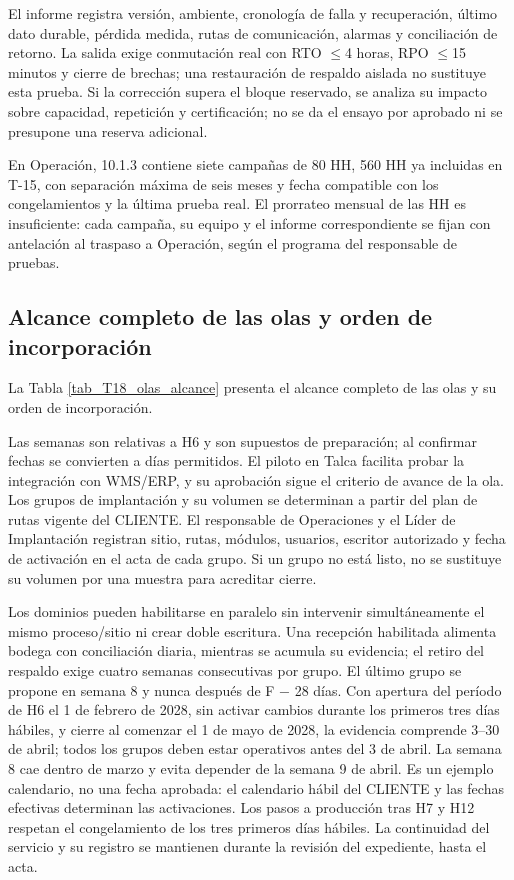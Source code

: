 El informe registra versión, ambiente, cronología de falla y recuperación, último dato durable, pérdida medida, rutas de comunicación, alarmas y conciliación de retorno. La salida exige conmutación real con RTO \ensuremath{\leq}4 horas, RPO \ensuremath{\leq}15 minutos y cierre de brechas; una restauración de respaldo aislada no sustituye esta prueba. Si la corrección supera el bloque reservado, se analiza su impacto sobre capacidad, repetición y certificación; no se da el ensayo por aprobado ni se presupone una reserva adicional.

En Operación, 10.1.3 contiene siete campañas de 80 HH, 560 HH ya incluidas en T-15, con separación máxima de seis meses y fecha compatible con los congelamientos y la última prueba real. El prorrateo mensual de las HH es insuficiente: cada campaña, su equipo y el informe correspondiente se fijan con antelación al traspaso a Operación, según el programa del responsable de pruebas.

\subsection{Alcance completo de las olas y orden de incorporación}

La Tabla \ref{tab_T18_olas_alcance} presenta el alcance completo de las olas y su orden de incorporación.


Las semanas son relativas a H6 y son supuestos de preparación; al confirmar fechas se convierten a días permitidos. El piloto en Talca facilita probar la integración con WMS/ERP, y su aprobación sigue el criterio de avance de la ola. Los grupos de implantación y su volumen se determinan a partir del plan de rutas vigente del CLIENTE. El responsable de Operaciones y el Líder de Implantación registran sitio, rutas, módulos, usuarios, escritor autorizado y fecha de activación en el acta de cada grupo. Si un grupo no está listo, no se sustituye su volumen por una muestra para acreditar cierre.

Los dominios pueden habilitarse en paralelo sin intervenir simultáneamente el mismo proceso/sitio ni crear doble escritura. Una recepción habilitada alimenta bodega con conciliación diaria, mientras se acumula su evidencia; el retiro del respaldo exige cuatro semanas consecutivas por grupo. El último grupo se propone en semana 8 y nunca después de F − 28 días. Con apertura del período de H6 el 1 de febrero de 2028, sin activar cambios durante los primeros tres días hábiles, y cierre al comenzar el 1 de mayo de 2028, la evidencia comprende 3–30 de abril; todos los grupos deben estar operativos antes del 3 de abril. La semana 8 cae dentro de marzo y evita depender de la semana 9 de abril. Es un ejemplo calendario, no una fecha aprobada: el calendario hábil del CLIENTE y las fechas efectivas determinan las activaciones. Los pasos a producción tras H7 y H12 respetan el congelamiento de los tres primeros días hábiles. La continuidad del servicio y su registro se mantienen durante la revisión del expediente, hasta el acta.

